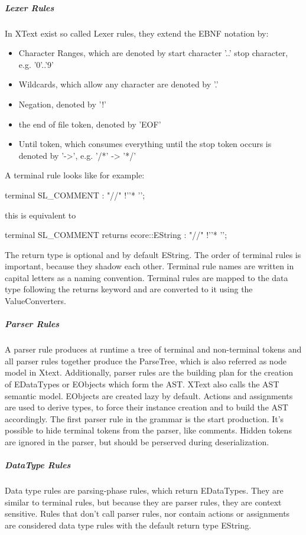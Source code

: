 \subparagraph{Lexer Rules}
In XText exist so called Lexer rules,  they extend the EBNF notation by:
\begin{itemize}
	\item Character Ranges, which are denoted by start character '..' stop character, e.g. '0'..'9' 
	\item Wildcards, which allow any character are denoted by '.'
	\item Negation, denoted by '!'
	\item the end of file token, denoted by 'EOF'
	\item Until token, which consumes everything until the stop token occurs is denoted by '->', e.g. '/*' -> '*/'
\end{itemize}
A terminal rule looks like for example:
\begin{xtxt}
terminal SL_COMMENT : "//" !'\n'* '\n';
\end{xtxt}
this is equivalent to 
\begin{xtxt}
terminal SL_COMMENT returns ecore::EString : "//" !'\n'* '\n';
\end{xtxt}
The return type is optional and by default EString. The order of terminal rules is important, because they shadow each other. Terminal rule names are written in capital letters as a naming convention. Terminal rules are mapped to the data type following the returns keyword and are converted to it using the ValueConverters.

\subparagraph{Parser Rules}
A parser rule produces at runtime a tree of terminal and non-terminal tokens and all parser rules together produce the ParseTree, which is also referred as node model in Xtext. Additionally, parser rules are the building plan for the creation of EDataTypes or EObjects which form the AST. XText also calls the AST semantic model. EObjects are created lazy by default. Actions and assignments are used to derive types, to force their instance creation and to build the AST accordingly. The first parser rule in the grammar is the start production. It's possible to hide terminal tokens from the parser, like comments. Hidden tokens are ignored in the parser, but should be perserved during deserialization.

\subparagraph{DataType Rules}
Data type rules are parsing-phase rules, which return EDataTypes. They are similar to terminal rules, but because they are parser rules, they are context sensitive. Rules that don't call parser rules, nor contain actions or assignments are considered data type rules with the default return type EString. 
\begin{xtxt}
Number returns ecore::EInt : NUM ('.' NUM*)?;}
\end{xtxt}


